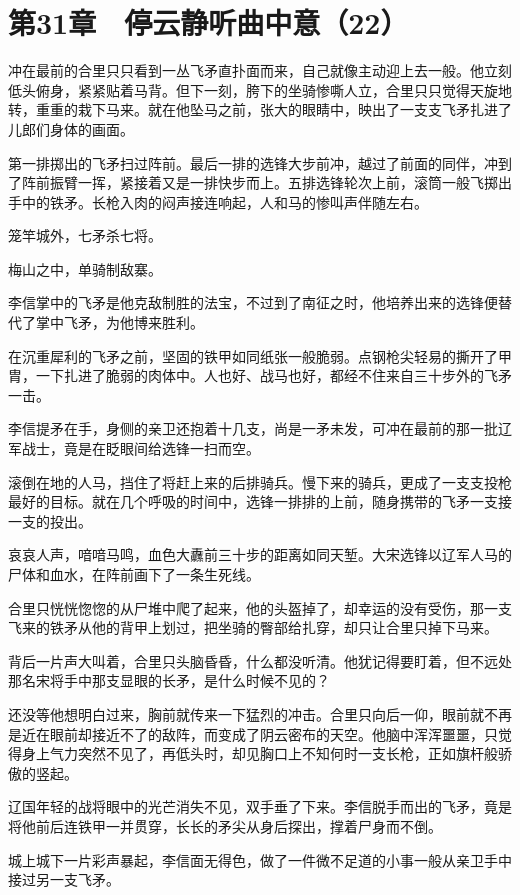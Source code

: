 \section{第31章　停云静听曲中意（22）}

冲在最前的合里只只看到一丛飞矛直扑面而来，自己就像主动迎上去一般。他立刻低头俯身，紧紧贴着马背。但下一刻，胯下的坐骑惨嘶人立，合里只只觉得天旋地转，重重的栽下马来。就在他坠马之前，张大的眼睛中，映出了一支支飞矛扎进了儿郎们身体的画面。

第一排掷出的飞矛扫过阵前。最后一排的选锋大步前冲，越过了前面的同伴，冲到了阵前振臂一挥，紧接着又是一排快步而上。五排选锋轮次上前，滚筒一般飞掷出手中的铁矛。长枪入肉的闷声接连响起，人和马的惨叫声伴随左右。

笼竿城外，七矛杀七将。

梅山之中，单骑制敌寨。

李信掌中的飞矛是他克敌制胜的法宝，不过到了南征之时，他培养出来的选锋便替代了掌中飞矛，为他博来胜利。

在沉重犀利的飞矛之前，坚固的铁甲如同纸张一般脆弱。点钢枪尖轻易的撕开了甲胄，一下扎进了脆弱的肉体中。人也好、战马也好，都经不住来自三十步外的飞矛一击。

李信提矛在手，身侧的亲卫还抱着十几支，尚是一矛未发，可冲在最前的那一批辽军战士，竟是在眨眼间给选锋一扫而空。

滚倒在地的人马，挡住了将赶上来的后排骑兵。慢下来的骑兵，更成了一支支投枪最好的目标。就在几个呼吸的时间中，选锋一排排的上前，随身携带的飞矛一支接一支的投出。

哀哀人声，喑喑马鸣，血色大纛前三十步的距离如同天堑。大宋选锋以辽军人马的尸体和血水，在阵前画下了一条生死线。

合里只恍恍惚惚的从尸堆中爬了起来，他的头盔掉了，却幸运的没有受伤，那一支飞来的铁矛从他的背甲上划过，把坐骑的臀部给扎穿，却只让合里只掉下马来。

背后一片声大叫着，合里只头脑昏昏，什么都没听清。他犹记得要盯着，但不远处那名宋将手中那支显眼的长矛，是什么时候不见的？

还没等他想明白过来，胸前就传来一下猛烈的冲击。合里只向后一仰，眼前就不再是近在眼前却接近不了的敌阵，而变成了阴云密布的天空。他脑中浑浑噩噩，只觉得身上气力突然不见了，再低头时，却见胸口上不知何时一支长枪，正如旗杆般骄傲的竖起。

辽国年轻的战将眼中的光芒消失不见，双手垂了下来。李信脱手而出的飞矛，竟是将他前后连铁甲一并贯穿，长长的矛尖从身后探出，撑着尸身而不倒。

城上城下一片彩声暴起，李信面无得色，做了一件微不足道的小事一般从亲卫手中接过另一支飞矛。

